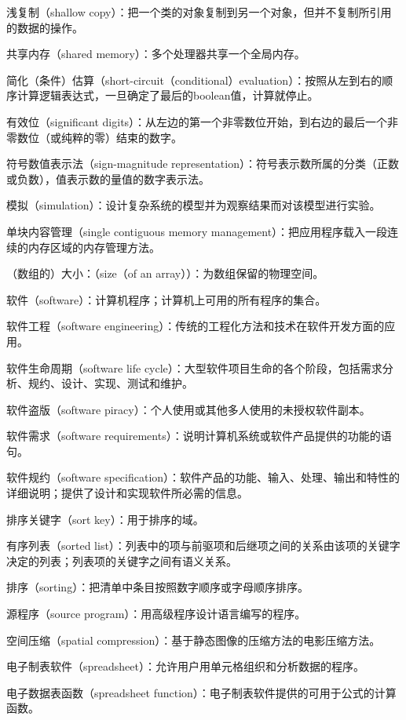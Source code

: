 浅复制（shallow copy）：把一个类的对象复制到另一个对象，但并不复制所引用的数据的操作。

共享内存（shared memory）：多个处理器共享一个全局内存。

简化（条件）估算（short-circuit（conditional）evaluation）：按照从左到右的顺序计算逻辑表达式，一旦确定了最后的boolean值，计算就停止。

有效位（significant digits）：从左边的第一个非零数位开始，到右边的最后一个非零数位（或纯粹的零）结束的数字。

符号数值表示法（sign-magnitude representation）：符号表示数所属的分类（正数或负数），值表示数的量值的数字表示法。

模拟（simulation）：设计复杂系统的模型并为观察结果而对该模型进行实验。

单块内容管理（single contiguous memory management）：把应用程序载入一段连续的内存区域的内存管理方法。

（数组的）大小：（size（of an array））：为数组保留的物理空间。

软件（software）：计算机程序；计算机上可用的所有程序的集合。

软件工程（software engineering）：传统的工程化方法和技术在软件开发方面的应用。

软件生命周期（software life cycle）：大型软件项目生命的各个阶段，包括需求分析、规约、设计、实现、测试和维护。

软件盗版（software piracy）：个人使用或其他多人使用的未授权软件副本。

软件需求（software requirements）：说明计算机系统或软件产品提供的功能的语句。

软件规约（software specification）：软件产品的功能、输入、处理、输出和特性的详细说明；提供了设计和实现软件所必需的信息。

排序关键字（sort key）：用于排序的域。

有序列表（sorted list）：列表中的项与前驱项和后继项之间的关系由该项的关键字决定的列表；列表项的关键字之间有语义关系。

排序（sorting）：把清单中条目按照数字顺序或字母顺序排序。

源程序（source program）：用高级程序设计语言编写的程序。

空间压缩（spatial compression）：基于静态图像的压缩方法的电影压缩方法。

电子制表软件（spreadsheet）：允许用户用单元格组织和分析数据的程序。

电子数据表函数（spreadsheet function）：电子制表软件提供的可用于公式的计算函数。


